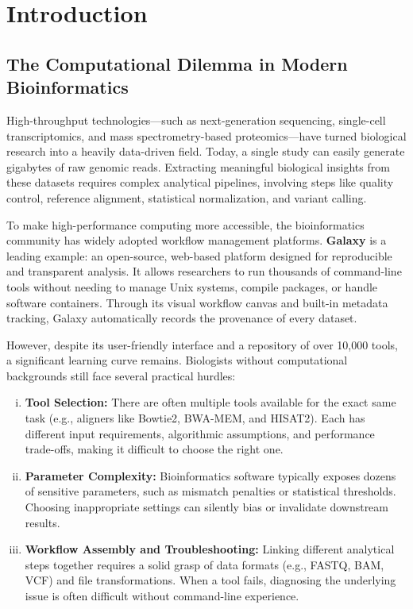 \chapter{Introduction}
\label{chap:introduction}

\section{The Computational Dilemma in Modern Bioinformatics}
\label{sec:bioinformatics_dilemma}

High-throughput technologies---such as next-generation sequencing, single-cell transcriptomics, and mass spectrometry-based proteomics---have turned biological research into a heavily data-driven field. Today, a single study can easily generate gigabytes of raw genomic reads. Extracting meaningful biological insights from these datasets requires complex analytical pipelines, involving steps like quality control, reference alignment, statistical normalization, and variant calling.

To make high-performance computing more accessible, the bioinformatics community has widely adopted workflow management platforms. \textbf{Galaxy} is a leading example: an open-source, web-based platform designed for reproducible and transparent analysis. It allows researchers to run thousands of command-line tools without needing to manage Unix systems, compile packages, or handle software containers. Through its visual workflow canvas and built-in metadata tracking, Galaxy automatically records the provenance of every dataset.

However, despite its user-friendly interface and a repository of over 10,000 tools, a significant learning curve remains. Biologists without computational backgrounds still face several practical hurdles:
\begin{enumerate}[(i)]
\item \textbf{Tool Selection:} There are often multiple tools available for the exact same task (e.g., aligners like Bowtie2, BWA-MEM, and HISAT2). Each has different input requirements, algorithmic assumptions, and performance trade-offs, making it difficult to choose the right one.
\item \textbf{Parameter Complexity:} Bioinformatics software typically exposes dozens of sensitive parameters, such as mismatch penalties or statistical thresholds. Choosing inappropriate settings can silently bias or invalidate downstream results.
\item \textbf{Workflow Assembly and Troubleshooting:} Linking different analytical steps together requires a solid grasp of data formats (e.g., FASTQ, BAM, VCF) and file transformations. When a tool fails, diagnosing the underlying issue is often difficult without command-line experience.
\end{enumerate}

